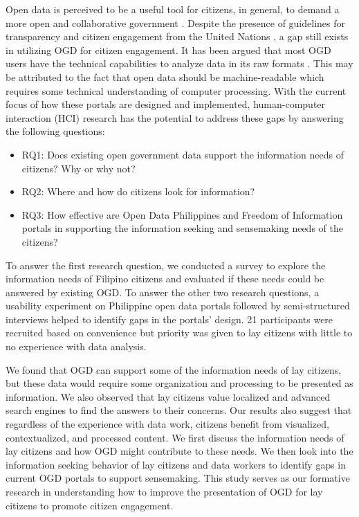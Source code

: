 \documentclass{sigchi}
\begin{document}
Open data is perceived to be a useful tool for citizens, in general, to demand a more open and collaborative government \cite{warwick2017}. Despite the presence of guidelines for transparency and citizen engagement from the United Nations \cite{UN2013}, a gap still exists in utilizing OGD for citizen engagement. It has been argued that most OGD users have the technical capabilities to analyze data in its raw formats \cite{DAWES201615}. This may be attributed to the fact that open data should be machine-readable which requires some technical understanding of computer processing. With the current focus of how these portals are designed and implemented, human-computer interaction (HCI) research has the potential to address these gaps by answering the following questions:
\begin{itemize}
  \item RQ1: Does existing open government data support the information needs of citizens? Why or why not?
  \item RQ2: Where and how do citizens look for information?
  \item RQ3: How effective are Open Data Philippines and Freedom of Information portals in supporting the information seeking and sensemaking needs of the citizens?
\end{itemize}

To answer the first research question, we conducted a survey to explore the information needs of Filipino citizens and evaluated if these needs could be answered by existing OGD. To answer the other two research questions, a usability experiment on Philippine open data portals followed by semi-structured interviews helped to identify gaps in the portals' design. 21 participants were recruited based on convenience but priority was given to lay citizens with little to no experience with data analysis.


We found that OGD can support some of the information needs of lay citizens, but these data would require some organization and processing to be presented as information. We also observed that lay citizens value localized and advanced search engines to find the answers to their concerns. Our results also suggest that regardless of the experience with data work, citizens benefit from visualized, contextualized, and processed content. We first discuss the information needs of lay citizens and how OGD might contribute to these needs. We then look into the information seeking behavior of lay citizens and data workers to identify gaps in current OGD portals to support sensemaking. This study serves as our formative research in understanding how to improve the presentation of OGD for lay citizens to promote citizen engagement.
\end{document}
